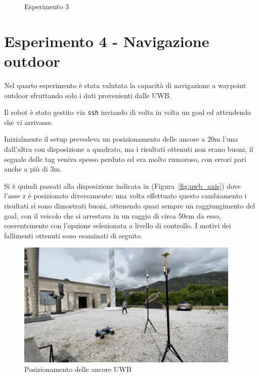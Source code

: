 \begin{figure}[ht]
\caption[Esperimento 3]{Esperimento 3}
\label{fig:esperimento_3}
\end{figure}
\clearpage

\section{Esperimento 4 - Navigazione outdoor}
\label{section3.4}
Nel quarto esperimento è stata valutata la capacità di navigazione a waypoint outdoor sfruttando solo i dati provenienti dalle UWB.

Il robot è stato gestito via \verb!ssh! inviando di volta in volta un goal ed attendendo che vi arrivasse. 

Inizialmente il setup prevedeva un posizionamento delle ancore a 20m l'una dall'altra con disposizione a quadrato, ma i risultati ottenuti non erano buoni, il segnale delle tag veniva spesso perduto ed era molto rumoroso, con errori pari anche a più di 3m.

Si è quindi passati alla disposizione indicata in (Figura~\ref{fig:uwb_axis}) dove l'asse z è posizionato diversamente; una volta effettuato questo cambiamento i risultati si sono dimostrati buoni, ottenendo quasi sempre un raggiungimento del goal, con il veicolo che si arrestava in un raggio di circa 50cm da esso, coerentemente con l'opzione selezionata a livello di controllo. I motivi dei fallimenti ottenuti sono esaminati di seguito.

\bigskip

\begin{figure}[h]
    \centering
    \includegraphics[width=0.95\textwidth]{Capitolo3/Figs/atelier.png}
    \caption[Posizionamento delle ancore UWB]{Posizionamento delle ancore UWB}
    \label{fig:posizione_ancore}
\end{figure}


